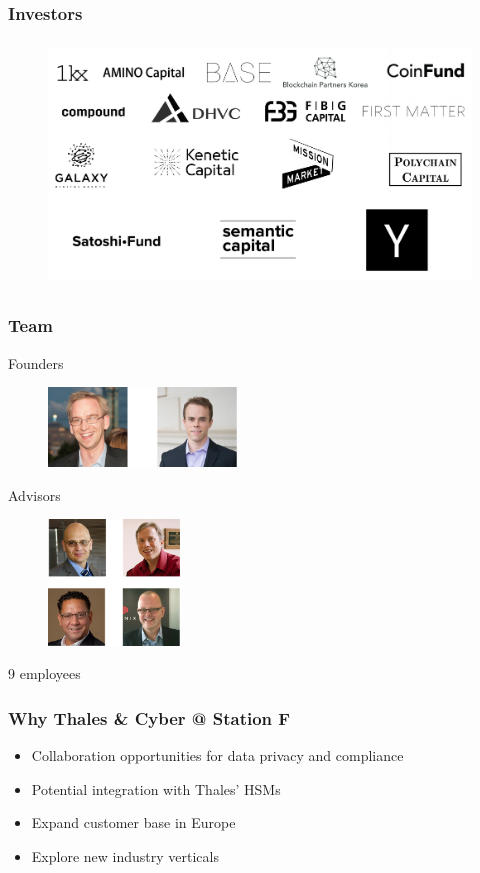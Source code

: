 \documentclass[xetex,mathsans,sans]{beamer}
\begin{document}
    \begin{frame}
      \frametitle{Investors}
        \begin{figure}
            \centering
            \includegraphics[height=6.5cm]{pdf/investors.pdf}
        \end{figure}
    \end{frame}

    \begin{frame}
      \frametitle{Team}
        Founders
        \begin{figure}
            \centering
            \includegraphics[width=5cm]{pdf/founders.pdf}
        \end{figure}

        Advisors
        \begin{figure}
            \centering
            \includegraphics[width=3.5cm]{pdf/advisors.pdf}
        \end{figure}

        9 employees
    \end{frame}

    \begin{frame}
      \frametitle{Why Thales \& Cyber @ Station F}
      \begin{itemize}
          \item Collaboration opportunities for data privacy and compliance
          \item Potential integration with Thales' HSMs
          \item Expand customer base in Europe
          \item Explore new industry verticals
      \end{itemize}
    \end{frame}
\end{document}
